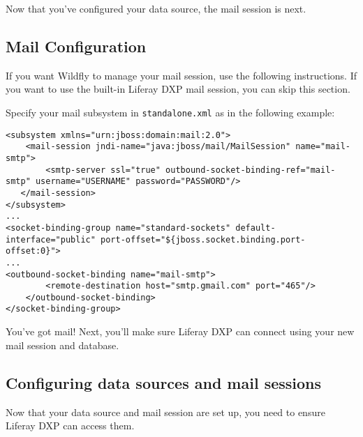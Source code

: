 Now that you've configured your data source, the mail session is next.

\subsection{Mail Configuration}\label{mail-configuration}

If you want Wildfly to manage your mail session, use the following
instructions. If you want to use the built-in Liferay DXP mail session,
you can skip this section.

Specify your mail subsystem in \texttt{standalone.xml} as in the
following example:

\begin{verbatim}
<subsystem xmlns="urn:jboss:domain:mail:2.0">
    <mail-session jndi-name="java:jboss/mail/MailSession" name="mail-smtp">
        <smtp-server ssl="true" outbound-socket-binding-ref="mail-smtp" username="USERNAME" password="PASSWORD"/>
   </mail-session>
</subsystem>
...
<socket-binding-group name="standard-sockets" default-interface="public" port-offset="${jboss.socket.binding.port-offset:0}">
...
<outbound-socket-binding name="mail-smtp">
        <remote-destination host="smtp.gmail.com" port="465"/>
    </outbound-socket-binding>
</socket-binding-group>
\end{verbatim}

You've got mail! Next, you'll make sure Liferay DXP can connect using
your new mail session and database.

\subsection{Configuring data sources and mail
sessions}\label{configuring-data-sources-and-mail-sessions}

Now that your data source and mail session are set up, you need to
ensure Liferay DXP can access them.

